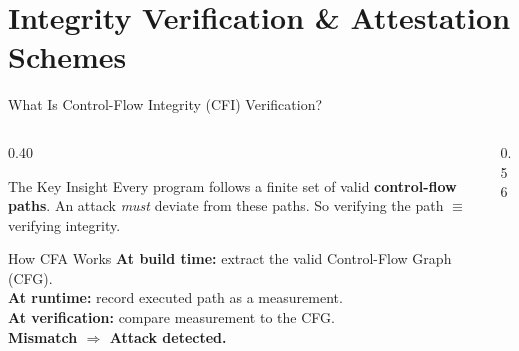 \documentclass[aspectratio=169, 10pt]{beamer}
\begin{document}
\section{Integrity Verification \& Attestation Schemes}

\begin{frame}{What Is Control-Flow Integrity (CFI) Verification?}
    \begin{columns}[T]
        \begin{column}{0.40\textwidth}
            \begin{defbox}{The Key Insight}
                \scriptsize Every program follows a finite set of valid
                \textbf{control-flow paths}.
                An attack \emph{must} deviate from these paths.
                So verifying the path $\equiv$ verifying integrity.
            \end{defbox}
            \vspace{6pt}
            \begin{greenbox}{How CFA Works}
                \scriptsize
                \textbf{At build time:} extract the valid Control-Flow Graph (CFG).\\[3pt]
                \textbf{At runtime:} record executed path as a measurement.\\[3pt]
                \textbf{At verification:} compare measurement to the CFG.\\[3pt]
                \textcolor{secred}{\textbf{Mismatch $\Rightarrow$ Attack detected.}}
            \end{greenbox}
        \end{column}
        \begin{column}{0.56\textwidth}
            \begin{center}
\end{center}
\end{column}
\end{columns}
\end{frame}
\end{document}
